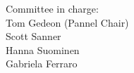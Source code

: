 \noindent
{\Huge{Committee in charge:} }\\[.4cm]
{\LARGE  Tom Gedeon (Pannel Chair) } \\[.1cm]
{\LARGE  Scott Sanner } \\[.1cm]
{\LARGE  Hanna Suominen } \\[.1cm]
{\LARGE  Gabriela Ferraro } \\[.1cm]



\newpage
%
%
%
